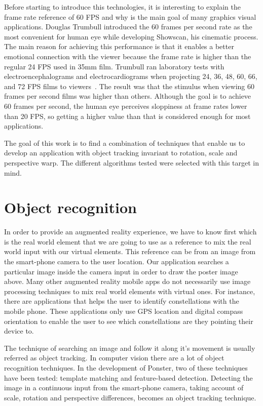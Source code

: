 Before starting to
introduce this technologies, it is interesting to explain the frame rate
reference of 60 FPS and why is the main goal of many graphics visual
applications.
Douglas Trumbull introduced the 60 frames per second rate as the most
convenient for human eye while developing Showscan, his cinematic process. The
main reason for achieving this performance is that it enables a better
emotional connection with the viewer because the frame rate is higher than the
regular 24 FPS used in 35mm film. Trumbull ran laboratory tests with
electroencephalograms and electrocardiograms when projecting 24, 36, 48, 60, 66, and
72 FPS films to viewers~\cite{trumbull}. The result was that the stimulus when 
viewing 60 frames per second films was higher than others.
Although the goal is to achieve 60 frames per
second, the human eye perceives sloppiness at frame rates lower than 20 FPS, so
getting a higher value than that is considered enough for most applications.

The goal of this work is to find a combination of techniques that enable us to
develop an application with object tracking invariant to rotation, scale and
perspective warp. The different algorithms tested were selected with this target
in mind. 

\section{Object recognition}
In order to provide an augmented reality experience, we have to know first
which is the real world element that we are going to use as a reference to mix
the real world input with our virtual elements. This reference can be from an
image from the smart-phone camera to the user location. Our application searches a
particular image inside the camera input in order to draw the poster image
above. Many other augmented reality mobile apps do not necessarily use image
processing techniques to mix real world elements with virtual ones. For
instance, there are applications that helps the user to identify constellations
with the mobile phone. These applications only use GPS location and digital
compass orientation to enable the user to see which constellations are they
pointing their device to.

The technique of searching an image and follow it along it's 
movement is usually referred as object tracking. 
In computer vision there are a lot of object recognition techniques. In the
development of Ponster, two of these techniques have been tested: template
matching and feature-based detection. Detecting the image in a continuous input from
the smart-phone camera, taking account of scale, rotation and perspective
differences, becomes an object tracking technique. 

